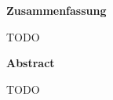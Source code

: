 %
% 

\chapter*{\ }


\begin{center}
	\begin{large}
		\textbf{Zusammenfassung}
	\end{large}
\end{center}
\vspace{0.75em}
TODO

\vspace{2em}
\begin{center}
	\begin{large}
		\textbf{Abstract}
	\end{large}
\end{center}
\vspace{0.75em}
TODO